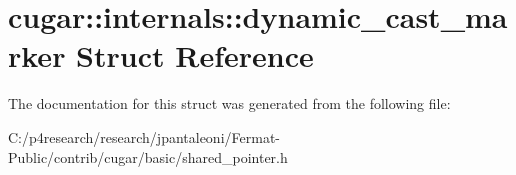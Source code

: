 \hypertarget{structcugar_1_1internals_1_1dynamic__cast__marker}{}\section{cugar\+:\+:internals\+:\+:dynamic\+\_\+cast\+\_\+marker Struct Reference}
\label{structcugar_1_1internals_1_1dynamic__cast__marker}


The documentation for this struct was generated from the following file\+:\begin{DoxyCompactItemize}
\item 
C\+:/p4research/research/jpantaleoni/\+Fermat-\/\+Public/contrib/cugar/basic/shared\+\_\+pointer.\+h\end{DoxyCompactItemize}
